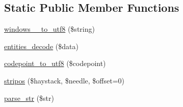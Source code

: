 \subsection*{Static Public Member Functions}
\begin{DoxyCompactItemize}
\item 
\hyperlink{class_simple_pie___misc_af038bc143f2303eeee24352040d2f2a6}{windows\-\_\-\_\-to\-\_\-utf8} (\$string)
\item 
\hyperlink{class_simple_pie___misc_aebbfa048bb19189aa7cf03153e28b1fe}{entities\-\_\-decode} (\$data)
\item 
\hyperlink{class_simple_pie___misc_a56d552454b813961ac9bd269b31e0e86}{codepoint\-\_\-to\-\_\-utf8} (\$codepoint)
\item 
\hyperlink{class_simple_pie___misc_a0e228ea0d2376a29a418b489e49f7281}{stripos} (\$haystack, \$needle, \$offset=0)
\item 
\hyperlink{class_simple_pie___misc_a537355202f43803da028ee5cdb74ecd3}{parse\-\_\-str} (\$str)
\end{DoxyCompactItemize}


